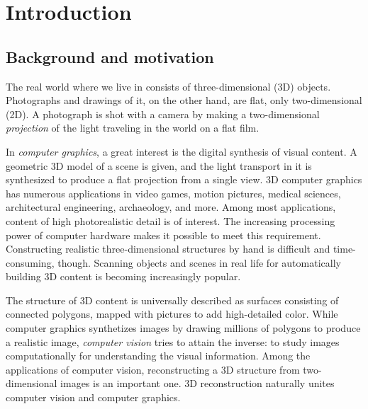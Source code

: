 \section{Introduction}

\thispagestyle{empty}

\subsection{Background and motivation}


The real world where we live in consists of three-dimensional (3D) objects.
Photographs and drawings of it, on the other hand, are flat, only two-dimensional (2D).
A photograph is shot with a camera by making a two-dimensional \emph{projection} of the light traveling in the world on a flat film.


In \emph{computer graphics}, a great interest is the digital synthesis of visual content.
A geometric 3D model of a scene is given, and the light transport in it is synthesized to produce a flat projection from a single view.
3D computer graphics has numerous applications in video games, motion pictures, medical sciences, architectural engineering, archaeology, and more.
Among most applications, content of high photorealistic detail is of interest.
The increasing processing power of computer hardware makes it possible to meet this requirement.
Constructing realistic three-dimensional structures by hand is difficult and time-consuming, though.
Scanning objects and scenes in real life for automatically building 3D content is becoming increasingly popular.


The structure of 3D content is universally described as surfaces consisting of connected polygons, mapped with pictures to add high-detailed color.
While computer graphics synthetizes images by drawing millions of polygons to produce a realistic image, \emph{computer vision} tries to attain the inverse:
to study images computationally for understanding the visual information.
Among the applications of computer vision, reconstructing a 3D structure from two-dimensional images is an important one.
3D reconstruction naturally unites computer vision and computer graphics.

